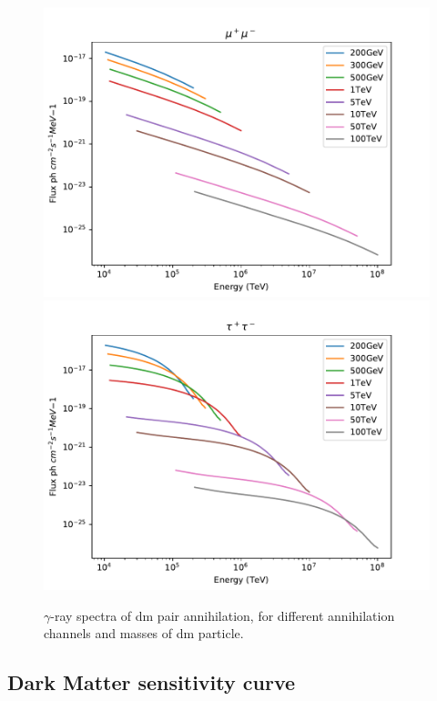 \documentclass{article}
\begin{document}
\begin{figure}
  \endminipage \\
  \includegraphics[width=1\textwidth]{Pictures/specMu.pdf}
  \endminipage
  \includegraphics[width=1\textwidth]{Pictures/specTau.pdf}
  \endminipage \\
  \caption{$\gamma$-ray spectra of \gls{dm} pair annihilation, for different annihilation channels and masses of \gls{dm} particle. }
  \label{fig:dmspec}
\end{figure}
 
  \subsection{Dark Matter sensitivity curve}\label{LMCsenscurv\gls{dm}}
\end{document}
